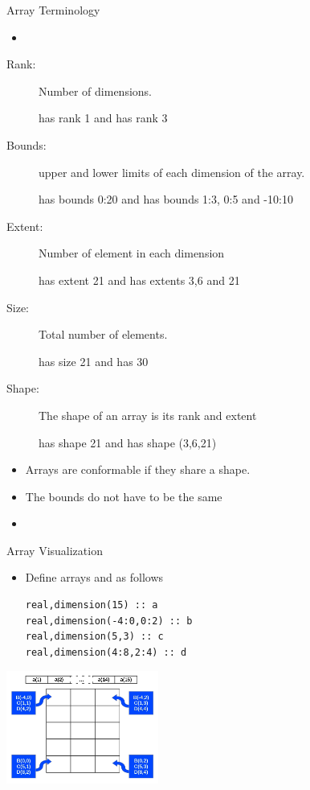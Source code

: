 \documentclass[10pt,t]{beamer}
\begin{document}
\begin{frame}{Array Terminology}
  \begin{itemize}
    \item[] 
  \end{itemize}
  \begin{description}
    \item[Rank:] Number of dimensions.
    \item[] {} has rank 1 and {} has rank 3
    \item[Bounds:] upper and lower limits of each dimension of the array.
    \item[] {} has bounds 0:20 and {} has bounds 1:3, 0:5 and -10:10
    \item[Extent:] Number of element in each dimension
    \item[] {} has extent 21 and {} has extents 3,6 and 21
    \item[Size:] Total number of elements.
    \item[] {} has size 21 and {} has 30
    \item[Shape:] The shape of an array is its rank and extent
    \item[]  has shape 21 and  has shape (3,6,21)
  \end{description}
  \begin{itemize}
    \item Arrays are conformable if they share a shape.
    \item The bounds do not have to be the same
    \item[] 
  \end{itemize}
\end{frame}

\begin{frame}[fragile]{Array Visualization}
  \begin{itemize}
    \item Define arrays  and  as follows
      \begin{lstlisting}[language={[90]Fortran}]
real,dimension(15) :: a
real,dimension(-4:0,0:2) :: b
real,dimension(5,3) :: c
real,dimension(4:8,2:4) :: d
      \end{lstlisting}
  \end{itemize}
  \begin{center}
    \includegraphics[width=5cm,clip=true]{./graphics/array2-3-1}
  \end{center}
\end{frame}
\end{document}
